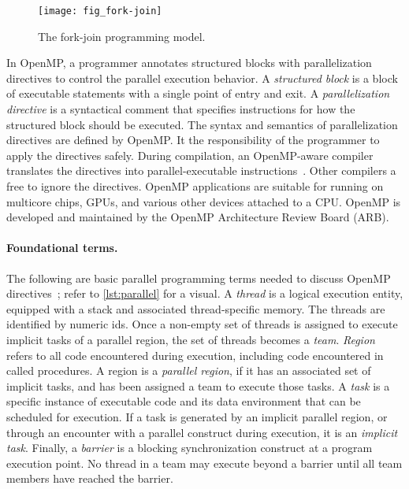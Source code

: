 \begin{figure}[H]
\centering
\texttt{[image: fig\_fork-join]}
\caption{The fork-join programming model.}
\label{fig:fork-join}
\end{figure}

In OpenMP, a programmer annotates {structured blocks} with parallelization {directives} to control the parallel execution behavior.
A \emph{structured block} is a block of executable statements with a single point of entry and exit.
A \emph{parallelization directive} is a syntactical comment that specifies instructions for how the {structured block} should be executed.
The syntax and semantics of {parallelization directives} are defined by OpenMP.
It the responsibility of the programmer to apply the directives safely.
During compilation, an OpenMP-aware compiler translates the directives into parallel-executable instructions~\cite{oak-slides}.
Other compilers a free to ignore the directives.
OpenMP applications are suitable for running on multicore chips, GPUs, and various other devices attached to a CPU.
OpenMP is developed and maintained by the OpenMP Architecture Review Board (ARB).

\paragraph*{Foundational terms.}
The following are basic parallel programming terms needed to discuss OpenMP directives~\cite{openmp_api};
refer to \autoref{lst:parallel} for a visual.
A \emph{thread} is a logical {execution entity}, equipped with a stack and associated thread-specific memory.
The threads are identified by numeric ids.
Once a non-empty set of threads is assigned to execute implicit tasks of a parallel region, the {set of threads} becomes a \emph{team}.
\emph{Region} refers to all {code} encountered during execution, including code encountered in called procedures.
A region is a \emph{parallel region}, if it has an associated set of implicit tasks, and has been assigned a team to execute those tasks.
A \emph{task} is a specific instance of {executable code and its data environment} that can be scheduled for execution.
If a task is generated by an implicit parallel region, or through an encounter with a parallel construct during execution, it is an \emph{implicit task}.
Finally, a \emph{barrier} is a blocking synchronization construct at a program {execution point}.
No thread in a team may execute beyond a barrier until all team members have reached the barrier.

